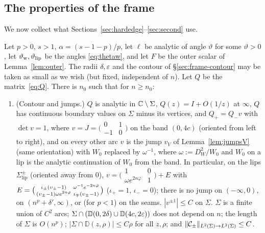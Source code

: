\subsection{The properties of the frame}\label{sec:outer-frame}
We now collect what Sections~\ref{sec:hardedge}--\ref{sec:second} use.

\begin{proposition}\label{prop:frame}
Let $p>0$, $s>1$, $\alpha=(s-1-p)/p$, let $\ell$ be analytic of angle $\vartheta$ for some $\vartheta>0$, let
$\vartheta_{\mathrm{w}},\vartheta_{\mathrm{lip}}$ be the angles \eqref{eq:thetaw}, and let $F$ be the outer scalar of Lemma~\ref{lem:outer}. The radii
$\delta,\varepsilon$ and the contour of \S\ref{sec:frame-contour} may be taken as small as we wish (but fixed, independent of
$n$). Let $Q$ be the matrix~\eqref{eq:Q}. There is $n_0$ such that for $n\ge n_0$:
\begin{enumerate}
\item[(i)] (Contour and jumps.) $Q$ is analytic in $\mathbb{C}\setminus\Sigma$, $Q(z)=I+O(1/z)$ at $\infty$, $Q$ has continuous
  boundary values on $\Sigma$ minus its vertices, and $Q_+=Q_-v$ with $\det v=1$, where
  $v=J=\bigl(\begin{smallmatrix}0&1\\-1&0\end{smallmatrix}\bigr)$ on the band $(0,4c)$ (oriented from left to right),
  and on every other arc $v$ is the jump $v_V$ of Lemma~\ref{lem:jumpsV} (same orientation) with $W_0$ replaced by
  $\omega^{-1}$, where $\omega:=D_W^2/W_0$ and $W_0$ on a lip is the analytic continuation of $W_0$ from the band. In
  particular, on the lips $\Sigma^\pm_{\mathrm{lip}}$ (oriented away from $0$),
  $v=\bigl(\begin{smallmatrix}1&0\\\omega e^{2n\varphi}&1\end{smallmatrix}\bigr)+E$ with
  $E=\bigl(\begin{smallmatrix}\iota_\pm(\upsilon_\pm-1)&\omega^{-1}e^{-2n\tilde\varphi}\\(\upsilon_\pm-1)\omega e^{2n\varphi}&\iota_\mp(\upsilon_\pm-1)\end{smallmatrix}\bigr)$
  ($\iota_+=1$, $\iota_-=0$); there is no jump on $(-\infty,0)$, on $(n^p+\delta',\infty)$, or (for $p<1$) on the
  seams. $|v^{\pm1}|\le C$ on $\Sigma$. $\Sigma$ is a finite union of $C^2$ arcs;
  $\Sigma\cap(\mathbb D(0,2\delta)\cup \mathbb D(4c,2\varepsilon))$ does not depend on $n$; the length of $\Sigma$ is $O(n^p)$;
  $|\Sigma\cap \mathbb D(z,\rho)|\le C\rho$ for all $z,\rho$; and $\|\mathcal{C}_\pm\|_{L^2(\Sigma)\to L^2(\Sigma)}\le C$.

\end{enumerate}
\end{proposition}
